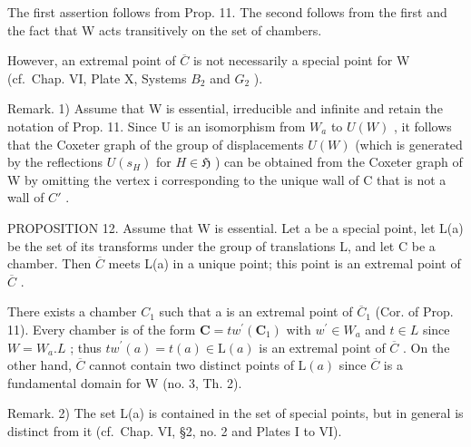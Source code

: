 The first assertion follows from Prop. 11. The second follows from the first and the fact that W acts transitively on the set of chambers.

However, an extremal point of \(\overline{C}\) is not necessarily a special point for W (cf.~Chap. VI, Plate X, Systems \(B_{2}\) and \(G_{2}\) ).

Remark. 1) Assume that W is essential, irreducible and infinite and retain the notation of Prop. 11. Since U is an isomorphism from \(W_{a}\) to \(U(W)\) , it follows that the Coxeter graph of the group of displacements \(U(W)\) (which is generated by the reflections \(U(s_{H})\) for \(H \in \mathfrak{H}\) ) can be obtained from the Coxeter graph of W by omitting the vertex i corresponding to the unique wall of C that is not a wall of \(C'\) .

PROPOSITION 12. Assume that W is essential. Let a be a special point, let L(a) be the set of its transforms under the group of translations L, and let C be a chamber. Then \(\overline{C}\) meets L(a) in a unique point; this point is an extremal point of \(\overline{C}\) .

There exists a chamber \(C_{1}\) such that a is an extremal point of \(\overline{C}_{1}\) (Cor. of Prop. 11). Every chamber is of the form \(\mathbf{C}=tw^{\prime}(\mathbf{C}_{1})\) with \(w^{\prime}\in W_{a}\) and \(t\in L\) since \(W=W_{a}.L\) ; thus \(tw^{\prime}(a)=t(a)\in\mathrm{L}(a)\) is an extremal point of \(\overline{C}\) . On the other hand, \(\overline{C}\) cannot contain two distinct points of \(\mathrm{L}(a)\) since \(\overline{C}\) is a fundamental domain for W (no. 3, Th. 2).

Remark. 2) The set L(a) is contained in the set of special points, but in general is distinct from it (cf.~Chap. VI, §2, no. 2 and Plates I to VI).

